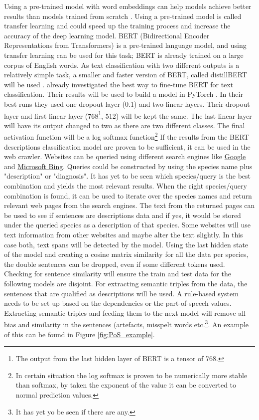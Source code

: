 \documentclass{article}
\begin{document}
Using a pre-trained model with word embeddings can help models achieve better results than models trained from scratch \autocite{mikolov_distributed_2013}.
Using a pre-trained model is called transfer learning and could speed up the training process and increase the accuracy of the deep learning model.
BERT (Bidirectional Encoder Representations from Transformers) \autocite{devlin_bert_2019} is a pre-trained language model, and using transfer learning can be used for this task; BERT is already trained on a large corpus of English words.
As text classification with two different outputs is a relatively simple task, a smaller and faster version of BERT, called distillBERT will be used \autocite{sanh_distilbert_2020}.
\textcite{sun_how_2020} already investigated the best way to fine-tune BERT for text classification. 
Their results will be used to build a model in PyTorch \autocite{paszke_pytorch_2019}.
In their best runs they used one dropout layer (0.1) and two linear layers. 
Their dropout layer and first linear layer (768\footnote{The output from the last hidden layer of BERT is a tensor of 768.}, 512) will be kept the same.
The last linear layer will have its output changed to two as there are two different classes.
The final activation function will be a log softmax function\footnote{In certain situation the log softmax is proven to be numerically more stable than softmax, by taken the exponent of the value it can be converted to normal prediction values.}
If the results from the BERT descriptions classification model are proven to be sufficient, it can be used in the web crawler.
Websites can be queried using different search engines like \href{www.google.com}{Google} and \href{www.bing.com}{Microsoft Bing}.
Queries could be constructed by using the species name plus "description" or "diagnosis". 
It has yet to be seen which species/query is the best combination and yields the most relevant results.
When the right species/query combination is found, it can be used to iterate over the species names and return relevant web pages from the search engines.
The text from the returned pages can be used to see if sentences are descriptions data and if yes, it would be stored under the queried species as a description of that species.
Some websites will use text information from other websites and maybe alter the text slightly. 
In this case both, text spans will be detected by the model. 
Using the last hidden state of the model and creating a cosine matrix similarity for all the data per species, the double sentences can be dropped, even if some different tokens used.
Checking for sentence similarity will ensure the train and test data for the following models are disjoint.
For extracting semantic triples from the data, the sentences that are qualified as descriptions will be used.
A rule-based system needs to be set up based on the dependencies or the part-of-speech values. 
Extracting semantic triples and feeding them to the next model will remove all bias and similarity in the sentences (artefacts, misspelt words etc.\footnote{It has yet yo be seen if there are any.}.
An example of this can be found in Figure \ref{fig:PoS_example}.
\end{document}
